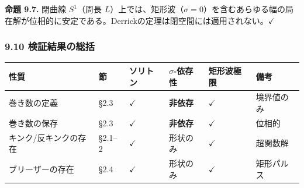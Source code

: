 \documentclass[a4paper,11pt]{ltjsarticle}
\newcounter{none}
\begin{document}
\textbf{命題 9.7.} 閉曲線 \(S^1\)（周長
\(L\)）上では、矩形波（\(\sigma = 0\)）を含むあらゆる幅の局在解が位相的に安定である。Derrickの定理は閉空間には適用されない。\(\checkmark\)

\subsubsection{9.10
検証結果の総括}\label{ux691cux8a3cux7d50ux679cux306eux7dcfux62ec}

{\def\LTcaptype{none} %
\begin{longtable}[]{@{}
  >{\centering\arraybackslash}p{}
  >{\centering\arraybackslash}p{}
  >{\centering\arraybackslash}p{}
  >{\centering\arraybackslash}p{}
  >{\centering\arraybackslash}p{}
  >{\centering\arraybackslash}p{}@{}}
\toprule\noalign{}
\begin{minipage}[b]{\linewidth}\centering
性質
\end{minipage} & \begin{minipage}[b]{\linewidth}\centering
節
\end{minipage} & \begin{minipage}[b]{\linewidth}\centering
ソリトン
\end{minipage} & \begin{minipage}[b]{\linewidth}\centering
\(\sigma\)-依存性
\end{minipage} & \begin{minipage}[b]{\linewidth}\centering
矩形波極限
\end{minipage} & \begin{minipage}[b]{\linewidth}\centering
備考
\end{minipage} \\
\midrule\noalign{}
\endhead
\bottomrule\noalign{}
\endlastfoot
巻き数の定義 & §2.3 & \(\checkmark\) & \textbf{非依存} & \(\checkmark\)
& 境界値のみ \\
巻き数の保存 & §2.3 & \(\checkmark\) & \textbf{非依存} & \(\checkmark\)
& 位相的 \\
キンク/反キンクの存在 & §2.1--2 & \(\checkmark\) & 形状のみ &
\(\checkmark\) & 超関数解 \\
ブリーザーの存在 & §2.4 & \(\checkmark\) & 形状のみ & \(\checkmark\) &
矩形パルス \\

\end{longtable}}
\end{document}
